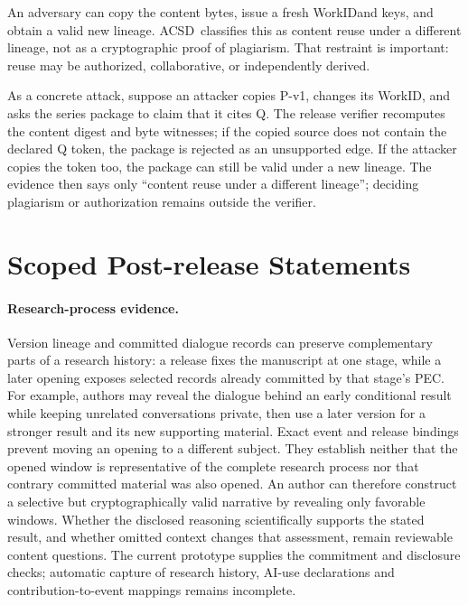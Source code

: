 \documentclass[acmsmall,screen,review,nonacm]{acmart}
\newcommand{\workid}{\textsf{WorkID}}
\newcommand{\acsd}{\textsc{ACSD}}
\begin{document}
An adversary can copy the content bytes, issue a fresh \workid and keys, and obtain a valid new lineage. \acsd\ classifies this as content reuse under a different lineage, not as a cryptographic proof of plagiarism. That restraint is important: reuse may be authorized, collaborative, or independently derived.

As a concrete attack, suppose an attacker copies P-v1, changes its WorkID,
and asks the series package to claim that it cites Q. The release verifier
recomputes the content digest and byte witnesses; if the copied source does not
contain the declared Q token, the package is rejected as an unsupported edge.
If the attacker copies the token too, the package can still be valid under a
new lineage. The evidence then says only “content reuse under a different
lineage”; deciding plagiarism or authorization remains outside the verifier.

\section{Scoped Post-release Statements}

\paragraph{Research-process evidence.}
Version lineage and committed dialogue records can preserve complementary
parts of a research history: a release fixes the manuscript at one stage,
while a later opening exposes selected records already committed by that
stage's PEC. For example, authors may reveal the dialogue behind an early
conditional result while keeping unrelated conversations private, then use
a later version for a stronger result and its new supporting material.
Exact event and release bindings prevent moving an opening to a different
subject. They establish neither that the opened window is representative of
the complete research process nor that contrary committed material was also
opened. An author can therefore construct a selective but cryptographically
valid narrative by revealing only favorable windows. Whether the disclosed
reasoning scientifically supports the stated result, and whether omitted
context changes that assessment, remain reviewable content questions. The current prototype supplies
the commitment and disclosure checks; automatic capture of research history,
AI-use declarations and contribution-to-event mappings remains incomplete.
\end{document}
